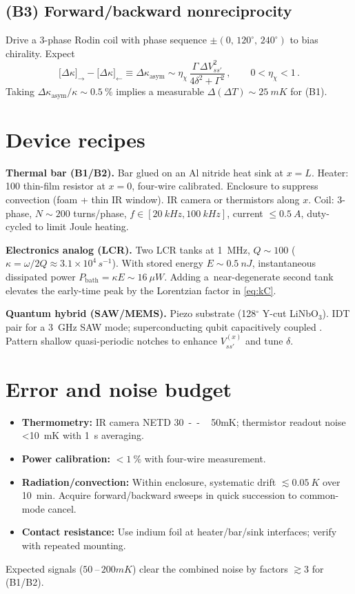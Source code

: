 \documentclass[12pt]{article}
\begin{document}
\subsection*{(B3) Forward/backward nonreciprocity}
Drive a 3-phase Rodin coil with phase sequence $\pm(0,\,120^\circ,\,240^\circ)$ to bias chirality. Expect
\begin{equation}
\big[\Delta\kappa\big]_{\rightarrow}-\big[\Delta\kappa\big]_{\leftarrow} \equiv \Delta\kappa_\text{asym} \sim \eta_\chi\, \frac{\Gamma\,\Delta V_{ss'}^{2}}{4\delta^2+\Gamma^2}\,,\qquad 0<\eta_\chi<1\,.
\end{equation}
Taking $\Delta\kappa_\text{asym}/\kappa\sim\SI{0.5}{\percent}$ implies a measurable $\Delta(\Delta T)\sim\SI{25}{mK}$ for (B1).


\section{Device recipes}
\textbf{Thermal bar (B1/B2).} Bar glued on an Al nitride heat sink at $x=L$. Heater: \SI{100}{\Omega} thin-film resistor at $x=0$, four-wire calibrated. Enclosure to suppress convection (foam + thin IR window). IR camera or thermistors along $x$. Coil: 3-phase, $N\sim200$ turns/phase, $f\in[\SI{20}{kHz},\SI{100}{kHz}]$, current $\le\SI{0.5}{A}$, duty-cycled to limit Joule heating. 


\textbf{Electronics analog (LCR).} Two LCR tanks at \SI{1}{MHz}, $Q\sim100$ ($\kappa=\omega/2Q\approx3.1\times10^4\,\si{s^{-1}}$). With stored energy $E\sim\SI{0.5}{nJ}$, instantaneous dissipated power $P_\text{bath}=\kappa E\sim\SI{16}{\mu W}$. Adding a\ near-degenerate second tank elevates the early-time peak by the Lorentzian factor in \eqref{eq:kC}.


\textbf{Quantum hybrid (SAW/MEMS).} Piezo substrate (128$^{\circ}$ Y-cut LiNbO$_3$). IDT pair for a \SI{3}{GHz} SAW mode; superconducting qubit capacitively coupled \cite{Aspelmeyer2014,Manenti2017}. Pattern shallow quasi-periodic notches to enhance $V^{(x)}_{ss'}$ and tune $\delta$.


\section{Error and noise budget}
\begin{itemize}
  \item \textbf{Thermometry:} IR camera NETD \SI{30}{--\,50}{mK}; thermistor readout noise \SI{<10}{mK} with \SI{1}{s} averaging. 
  \item \textbf{Power calibration:} $<\!\SI{1}{\percent}$ with four-wire measurement. 
  \item \textbf{Radiation/convection:} Within enclosure, systematic drift $\lesssim\SI{0.05}{K}$ over \SI{10}{min}. Acquire forward/backward sweeps in quick succession to common-mode cancel.
  \item \textbf{Contact resistance:} Use indium foil at heater/bar/sink interfaces; verify with repeated mounting.
\end{itemize}
Expected signals ($\SI{50}{\text{--}\,200}{mK}$) clear the combined noise by factors $\gtrsim3$ for (B1/B2).
\end{document}
